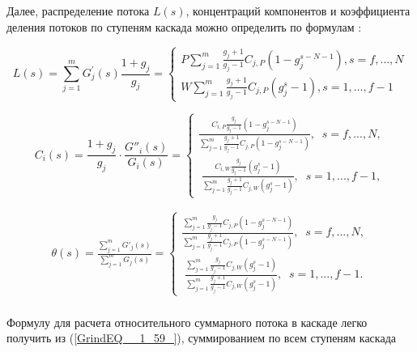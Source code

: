 Далее, распределение потока $L(s)$, концентраций компонентов и коэффициента деления потоков по ступеням каскада можно определить по формулам \cite{sulaberidzeTeoriyaKaskadovDlya2011}:

\begin{equation} \label{GrindEQ__1_59_} 
  L(s)=\sum_{j=1}^{m} G_{j}^{\prime}(s) \frac{1+g_{j}}{g_{j}}=\left\{\begin{array}{c}
  P \sum_{j=1}^{m} \frac{g_{j}+1}{g_{j}-1} C_{j,P}\left(1-g_{j}^{s-N-1}\right), s=f, \ldots, N \\
  W \sum_{j=1}^{m} \frac{g_{j}+1}{g_{j}-1} C_{j,P}\left(g_{j}^{s}-1\right), s=1, \ldots, f-1
  \end{array}\right.
\end{equation} 

\begin{equation} \label{GrindEQ__1_60_} 
  C_{i} (s)=\frac{1+g_{j} }{g_{j} } \cdot \frac{G''_{i} (s)}{G_{i} (s)} =\left\{\begin{array}{l} {\frac{C_{i,P} \frac{g_{j} }{g_{j} -1} \left(1-g_{j}^{s-N-1} \right)}{\sum _{j=1}^{m}\frac{g_{j} +1}{g_{j} -1}  C_{j,P} \left(1-g_{j}^{s-N-1} \right)} ,\; \; s=f,...,N,} \\ {\; \frac{C_{i,W} \frac{g_{j} }{g_{j} -1} \left(g_{j}^{s} -1\right)}{\sum _{j=1}^{m}\frac{g_{j} +1}{g_{j} -1}  C_{j,W} \left(g_{j}^{s} -1\right)} ,\; \; s=1,...,f-1,} \end{array}\right.  
\end{equation} 

\begin{equation} \label{GrindEQ__1_61_} 
\begin{array}{l} {\theta (s)=\frac{\sum _{j=1}^{m}G'_{j} (s) }{\sum _{j=1}^{m}G_{j} (s) } =\left\{\begin{array}{l} {\frac{\sum _{j=1}^{m}\frac{g_{j} }{g_{j} -1} C_{j,P} \left(1-g_{j}^{s-N-1} \right) }{\sum _{j=1}^{m}\frac{g_{j} +1}{g_{j} -1}  C_{j,P} \left(1-g_{j}^{s-N-1} \right)} ,\; \; s=f,...,N,} \\ {\; \frac{\sum _{j=1}^{m}\frac{g_{j} }{g_{j} -1} C_{j,W} \left(g_{j}^{s} -1\right) }{\sum _{j=1}^{m}\frac{g_{j} +1}{g_{j} -1}  C_{j,W} \left(g_{j}^{s} -1\right)} ,\; \; s=1,...,f-1.} \end{array}\right. } \\ {\; } \end{array} 
\end{equation}

Формулу для расчета относительного суммарного потока в каскаде легко получить из (\ref{GrindEQ__1_59_}), суммированием по всем ступеням каскада

